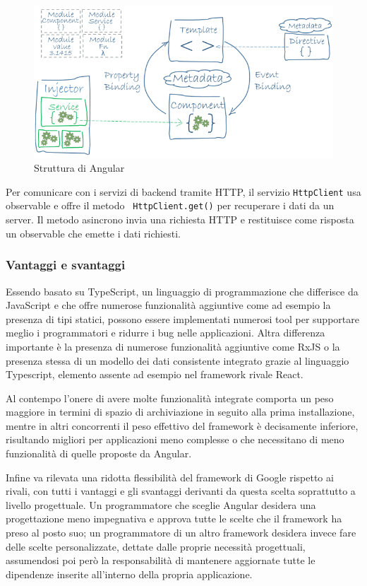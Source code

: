 \begin{figure}[H]
\centering
\includegraphics[scale=0.5]{res/angular.png}
\caption{Struttura di Angular}
\label{fig:angular}
\end{figure}

Per comunicare con i servizi di backend tramite HTTP, il servizio \texttt{HttpClient} usa observable e offre il metodo \
\texttt{HttpClient.get()} per recuperare i dati da un server. Il metodo asincrono invia una richiesta HTTP e restituisce come risposta un observable che emette i dati richiesti.

\subsubsection{Vantaggi e svantaggi}

Essendo basato su TypeScript, un linguaggio di programmazione che differisce da JavaScript e che offre numerose funzionalità aggiuntive come ad esempio la presenza di tipi statici, possono essere implementati numerosi tool per supportare meglio i programmatori e ridurre i bug nelle applicazioni.
Altra differenza importante è la presenza di numerose funzionalità aggiuntive come RxJS o la presenza stessa di un modello dei dati consistente integrato grazie al linguaggio Typescript, elemento assente ad esempio nel framework rivale React.

Al contempo l’onere di avere molte funzionalità integrate comporta un peso maggiore in termini di spazio di archiviazione in seguito alla prima installazione, mentre in altri concorrenti il peso effettivo del framework è decisamente inferiore, risultando
migliori per applicazioni meno complesse o che necessitano di meno funzionalità di quelle proposte da Angular.

Infine va rilevata una ridotta flessibilità del framework di Google rispetto ai rivali, con tutti i vantaggi e gli svantaggi derivanti da questa scelta soprattutto a livello progettuale. Un programmatore che sceglie Angular desidera una progettazione meno
impegnativa e approva tutte le scelte che il framework ha preso al posto suo; un programmatore di un altro framework desidera invece fare delle scelte personalizzate, dettate dalle proprie necessità progettuali, assumendosi poi però la responsabilità di mantenere aggiornate tutte le dipendenze inserite all’interno della propria applicazione.

